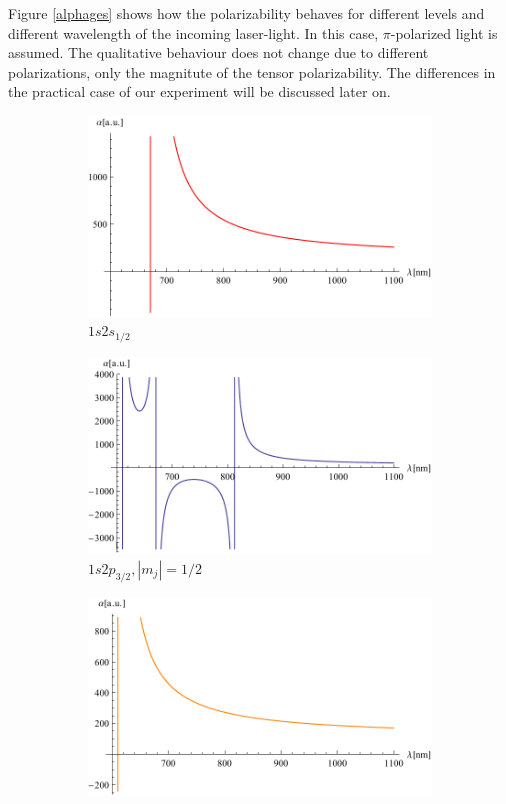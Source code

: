 Figure \ref{alphages} shows how the polarizability behaves for different levels and different wavelength of the incoming laser-light. In this case, $\pi$-polarized light is assumed. The qualitative behaviour does not change due to different polarizations, only the magnitute of the tensor polarizability. The differences in the practical case of our experiment will be discussed later on.
\begin{figure}[H]
\centering
\begin{subfigure}[b]{0.4\textwidth}
                \includegraphics[width=\textwidth]{alphaground}
                \caption{$1s2s_{1/2}$}
\end{subfigure}
\begin{subfigure}[b]{0.4\textwidth}
               \includegraphics[width=\textwidth]{alphaexited12}
                \caption{$1s2p_{3/2}, |m_j|=1/2$}
\end{subfigure}
\begin{subfigure}[b]{0.4\textwidth}
               \includegraphics[width=\textwidth]{alphaexited32}

\end{subfigure}
\end{figure}
